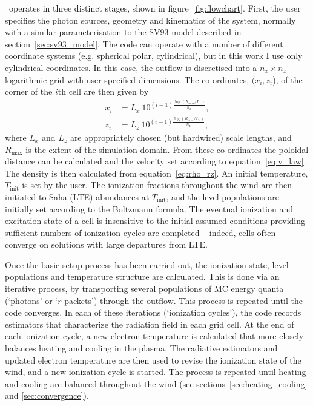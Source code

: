 \py\ operates in three distinct stages, shown in figure~\ref{fig:flowchart}. 
First, the user specifies the photon sources,
geometry and kinematics of the system, normally with a similar parameterisation
to the SV93 model described in section~\ref{sec:sv93_model}. 
The code can operate with a number of different coordinate systems 
(e.g. spherical polar, cylindrical), but in this work I use only cylindrical coordinates.
In this case, the outflow is discretised into a $n_x \times n_z$ logarithmic grid with 
user-specified dimensions. The co-ordinates, $(x_i, z_i$), 
of the corner of the $i$th cell are then given by
\begin{align}
x_i &= L_{x}~10^{(i-1)\frac{\log (R_{\mathrm{max}} / L_{x})}{n_x}},\\
z_i &= L_{z}~10^{(i-1)\frac{\log (R_{\mathrm{max}} / L_{z})}{n_z}},
\end{align}
where $L_x$ and $L_z$ are appropriately chosen (but hardwired) scale lengths, and $R_{\mathrm{max}}$ 
is the extent of the simulation domain.
From these co-ordinates the poloidal distance can be calculated and
the velocity set according to equation~\ref{eq:v_law}. The density
is then calculated from equation~\ref{eq:rho_rz}. An initial temperature,
$T_{\mathrm{init}}$ is set by the user. The ionization fractions throughout
the wind are then initiated to Saha (LTE) abundances at $T_{\mathrm{init}}$, and the level 
populations are initially set according to the Boltzmann formula. The eventual
ionization and excitation state of a cell is insensitive to the initial assumed 
conditions providing sufficient numbers of ionization cycles are completed -- 
indeed, cells often converge on solutions with large departures from LTE.

Once the basic setup process has been carried out, the ionization state,
level populations and temperature structure are calculated.
This is done via an iterative process, by transporting several populations of 
MC energy quanta (`photons' or `$r$-packets') through the outflow.
This process is repeated until the code converges.
In each of these iterations (`ionization cycles'), the code records estimators that 
characterize the radiation field in each grid cell. At the end 
of each ionization cycle, a new electron temperature is calculated
that more closely balances heating and cooling in the 
plasma. The radiative estimators and updated electron
temperature are then used to revise the ionization state of the wind,
and a new ionization cycle is started. The process is repeated until
heating and cooling are balanced throughout the wind (see sections~\ref{sec:heating_cooling}
and \ref{sec:convergence}). 

